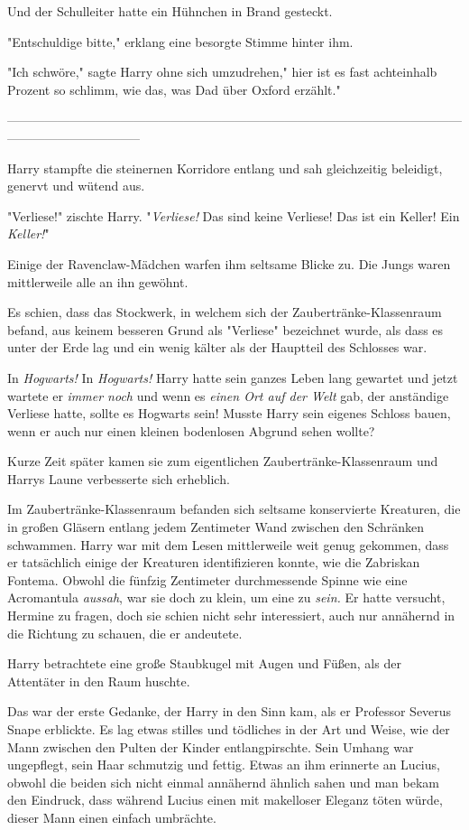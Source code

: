 {Und der Schulleiter hatte ein Hühnchen in Brand gesteckt.

"Entschuldige bitte," erklang eine besorgte Stimme hinter ihm.

"Ich schwöre," sagte Harry ohne sich umzudrehen," hier ist es fast achteinhalb Prozent so schlimm, wie das, was Dad über Oxford erzählt."

--------------------------------------------------------------------------------------------------------------------------------------------

Harry stampfte die steinernen Korridore entlang und sah gleichzeitig beleidigt, genervt und wütend aus.

"Verliese!" zischte Harry. "\emph{Verliese!} Das sind keine Verliese! Das ist ein Keller! Ein \emph{Keller!}"

Einige der Ravenclaw-Mädchen warfen ihm seltsame Blicke zu. Die Jungs waren mittlerweile alle an ihn gewöhnt.

Es schien, dass das Stockwerk, in welchem sich der Zaubertränke-Klassenraum befand, aus keinem besseren Grund als "Verliese" bezeichnet wurde, als dass es unter der Erde lag und ein wenig kälter als der Hauptteil des Schlosses war.

In \emph{Hogwarts!} In \emph{Hogwarts!} Harry hatte sein ganzes Leben lang gewartet und jetzt wartete er \emph{immer noch} und wenn es \emph{einen Ort auf der Welt} gab, der anständige Verliese hatte, sollte es Hogwarts sein! Musste Harry sein eigenes Schloss bauen, wenn er auch nur einen kleinen bodenlosen Abgrund sehen wollte?

Kurze Zeit später kamen sie zum eigentlichen Zaubertränke-Klassenraum und Harrys Laune verbesserte sich erheblich.

Im Zaubertränke-Klassenraum befanden sich seltsame konservierte Kreaturen, die in großen Gläsern entlang jedem Zentimeter Wand zwischen den Schränken schwammen. Harry war mit dem Lesen mittlerweile weit genug gekommen, dass er tatsächlich einige der Kreaturen identifizieren konnte, wie die Zabriskan Fontema. Obwohl die fünfzig Zentimeter durchmessende Spinne wie eine Acromantula \emph{aussah}, war sie doch zu klein, um eine zu \emph{sein.} Er hatte versucht, Hermine zu fragen, doch sie schien nicht sehr interessiert, auch nur annähernd in die Richtung zu schauen, die er andeutete.

Harry betrachtete eine große Staubkugel mit Augen und Füßen, als der Attentäter in den Raum huschte.

Das war der erste Gedanke, der Harry in den Sinn kam, als er Professor Severus Snape erblickte. Es lag etwas stilles und tödliches in der Art und Weise, wie der Mann zwischen den Pulten der Kinder entlangpirschte. Sein Umhang war ungepflegt, sein Haar schmutzig und fettig. Etwas an ihm erinnerte an Lucius, obwohl die beiden sich nicht einmal annähernd ähnlich sahen und man bekam den Eindruck, dass während Lucius einen mit makelloser Eleganz töten würde, dieser Mann einen einfach umbrächte.

}
